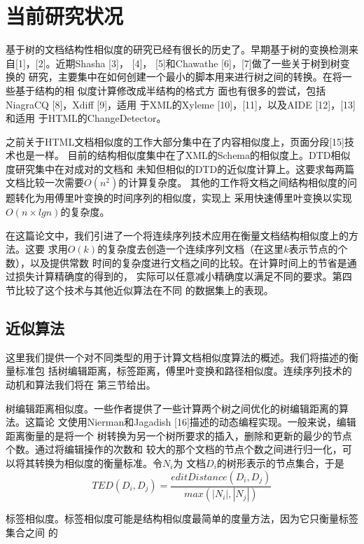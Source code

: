 \section{当前研究状况}
基于树的文档结构性相似度的研究已经有很长的历史了。早期基于树的变换检测来
自[1]，[2]。近期Shasha [3]， [4]， [5]和Chawathe [6]，[7]做了一些关于树到树变换的
研究，主要集中在如何创建一个最小的脚本用来进行树之间的转换。在将一些基于结构的相
似度计算修改成半结构的格式方
面也有很多的尝试，包括NiagraCQ [8]，Xdiff [9]，适用
于XML的Xyleme [10]，[11]，以及AIDE [12]，[13]和适用
于HTML的ChangeDetector\textsuperscript{\texttrademark}。

之前关于HTML文档相似度的工作大部分集中在了内容相似度上，页面分段[15]技术也是一样。
目前的结构相似度集中在了XML的Schema的相似度上。DTD相似度研究集中在对成对的文档和
未知但相似的DTD的近似度计算上。这要求每两篇文档比较一次需要$O(n^2)$的计算复杂度。
其他的工作将文档之间结构相似度的问题转化为用傅里叶变换的时间序列的相似度，实现上
采用快速傅里叶变换以实现$O(n\times lgn)$的复杂度。

在这篇论文中，我们引进了一个将连续序列技术应用在衡量文档结构相似度上的方法。这要
求用$O(k)$的复杂度去创造一个连续序列文档（在这里$k$表示节点的个数），以及提供常数
时间的复杂度进行文档之间的比较。在计算时间上的节省是通过损失计算精确度的得到的，
实际可以任意减小精确度以满足不同的要求。第四节比较了这个技术与其他近似算法在不同
的数据集上的表现。

\subsection{近似算法}
这里我们提供一个对不同类型的用于计算文档相似度算法的概述。我们将描述的衡量标准包
括树编辑距离，标签距离，傅里叶变换和路径相似度。连续序列技术的动机和算法我们将在
第三节给出。

树编辑距离相似度。一些作者提供了一些计算两个树之间优化的树编辑距离的算法。这篇论
文使用Nierman和Jagadish [16]描述的动态编程实现。一般来说，编辑距离衡量的是将一个
树转换为另一个树所要求的插入，删除和更新的最少的节点个数。通过将编辑操作的次数和
较大的那个文档的节点个数之间进行归一化，可以将其转换为相似度的衡量标准。令$N_i$为
文档$D_i$的树形表示的节点集合，于是
\[
TED(D_i,D_j)=\frac{editDistance(D_i,D_j)}{max(|N_i|,|N_j|)}
\]

标签相似度。标签相似度可能是结构相似度最简单的度量方法，因为它只衡量标签集合之间
的
